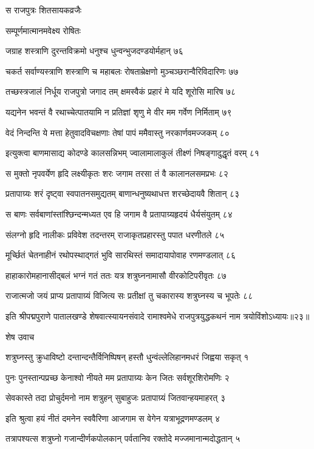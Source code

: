 स राजपुत्रः शितसायकव्रजैः

सम्पूर्णमात्मानमवेक्ष्य रोषितः

जग्राह शस्त्राणि दुरन्तविक्रमो
धनुश्च धुन्वन्भुजदण्डयोर्महान् ७६

चकर्त सर्वाण्यस्त्राणि शस्त्राणि च महाबलः
रोषताम्रेक्षणो मुञ्चञ्छरान्वैरिविदारिणः ७७

तच्छस्त्रजालं निर्धूय राजपुत्रो जगाद तम्
क्षमस्वैकं प्रहारं मे यदि शूरोसि मारिष ७८

यद्यनेन भवन्तं वै रथाच्चेत्पातयामि न
प्रतिज्ञां शृणु मे वीर मम गर्वेण निर्मिताम् ७९

वेदं निन्दन्ति ये मत्ता हेतुवादविचक्षणाः
तेषां पापं ममैवास्तु नरकार्णवमज्जकम् ८०

इत्युक्त्वा बाणमासाद्य कोदण्डे कालसन्निभम्
ज्वालामालाकुलं तीक्ष्णं निषङ्गादुद्धृतं वरम् ८१

स मुक्तो नृपवर्येण हृदि लक्ष्यीकृतः शरः
जगाम तरसा तं वै कालानलसमप्रभः ८२

प्रतापाग्र्यः शरं दृष्ट्वा स्वपातनसमुद्यतम्
बाणान्धनुष्यथाधत्त शरच्छेदायवै शितान् ८३

स बाणः सर्वबाणांस्तांश्छिन्दन्मध्यत एव हि
जगाम वै प्रतापाग्र्यहृदयं धैर्यसंयुतम् ८४

संलग्नो हृदि नालीकः प्रविवेश तदन्तरम्
राजाकृतप्रहारस्तु पपात धरणीतले ८५

मूर्च्छितं चेतनाहीनं रथोपस्थाद्गतं भुवि
सारथिस्तं समादायापोवाह रणमण्डलात् ८६

हाहाकारोमहानासीद्बलं भग्नं गतं ततः
यत्र शत्रुघ्ननामासौ वीरकोटिपरीवृतः ८७

राजात्मजो जयं प्राप्य प्रतापाग्र्यं विजित्य सः
प्रतीक्षां तु चकारास्य शत्रुघ्नस्य च भूपतेः ८८

इति श्रीपद्मपुराणे पातालखण्डे शेषवात्स्यायनसंवादे रामाश्वमेधे राजपुत्रयुद्धकथनं नाम त्रयोविंशोऽध्यायः॥२३॥


शेष उवाच

शत्रुघ्नस्तु क्रुधाविष्टो दन्तान्दन्तैर्विनिष्पिषन्
हस्तौ धुन्वंल्लेलिहानमधरं जिह्वया सकृत् १

पुनः पुनस्तान्पप्रच्छ केनाश्वो नीयते मम
प्रतापाग्र्यः केन जितः सर्वशूरशिरोमणिः २

सेवकास्ते तदा प्रोचुर्दमनो नाम शत्रुहन्
सुबाहुजः प्रतापाग्र्यं जितवान्हयमाहरत् ३

इति श्रुत्वा हयं नीतं दमनेन स्ववैरिणा
आजगाम स वेगेन यत्राभूद्रणमण्डलम् ४

तत्रापश्यत्स शत्रुघ्नो गजान्दीर्णकपोलकान्
पर्वतानिव रक्तोदे मज्जमानान्मदोद्धतान् ५


